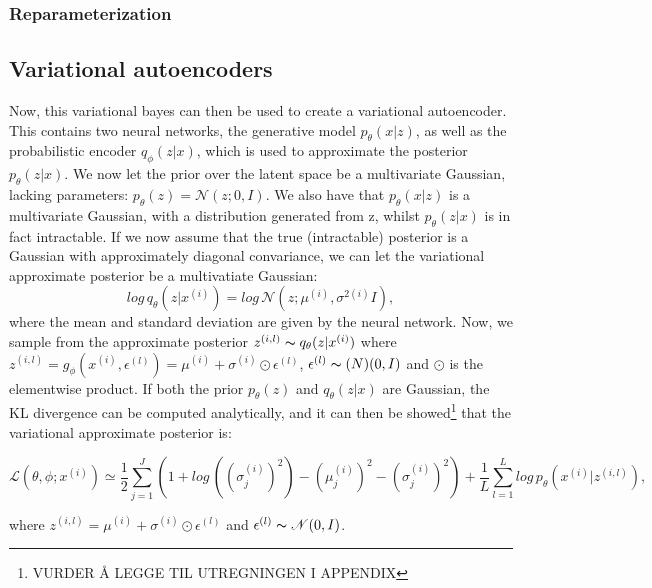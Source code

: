 \subsubsection*{Reparameterization}\label{sec:reparameterization}

\subsection*{Variational autoencoders}
Now, this variational bayes can then be used to create a variational autoencoder. This contains two neural networks, the generative model $p_{\theta}(x|z)$,
as well as the probabilistic encoder $q_{\phi}(z|x)$, which is used to approximate the posterior $p_{\theta}(z|x)$. We now let the prior over 
the latent space be a multivariate Gaussian, lacking parameters: $p_{\theta}(z) = \mathcal{N}(z;0,I)$. We also have that $p_{\theta}(x|z)$ is a multivariate Gaussian,
with a distribution generated from z, whilst $p_{\theta}(z|x)$ is in fact intractable. If we now assume that the true (intractable) posterior 
is a Gaussian with approximately diagonal convariance, we can let the variational approximate posterior be a multivatiate Gaussian:
\begin{equation}
    log\, q_{\theta}(z|x^{(i)}) = log\, \mathcal{N}(z;\mu^{(i)},\sigma^{2(i)}I),
\end{equation}
where the mean and standard deviation are given by the neural network. Now, we sample from the approximate posterior $z^{(i,l)} \thicksim q_{\theta}(z|x^{(i)})$
where $z^{(i,l)} = g_{\phi}(x^{(i)}, \epsilon^{(l)}) = \mu^{(i)} + \sigma^{(i)} \odot \epsilon^{(l)}$, $\epsilon^{(l)} \thicksim \mathcal(N)(0,I)$ and $\odot$
is the elementwise product. If both the prior $p_{\theta}(z)$ and $q_{\theta}(z|x)$ are Gaussian, the KL divergence can be computed analytically, and it 
can then be showed\footnote{VURDER Å LEGGE TIL UTREGNINGEN I APPENDIX}\cite{VAE} that the variational approximate posterior is:

\begin{equation}\label{eq:loss_vae}
    \mathcal{L}(\theta, \phi;x^{(i)}) \simeq \frac{1}{2}\sum_{j=1}^{J}(1 + log\, ((\sigma^{(i)}_{j})^2) - (\mu^{(i)}_{j})^2 - (\sigma^{(i)}_{j})^2) +\frac{1}{L}\sum_{l=1}^{L}log\, p_{\theta}(x^{(i)}|z^{(i,l)}),
\end{equation}

where $z^{(i,l)} = \mu^{(i)} + \sigma^{(i)} \odot \epsilon^{(l)}$ and $ \epsilon^{(l)} \thicksim \mathcal{N}(0,I)$.

